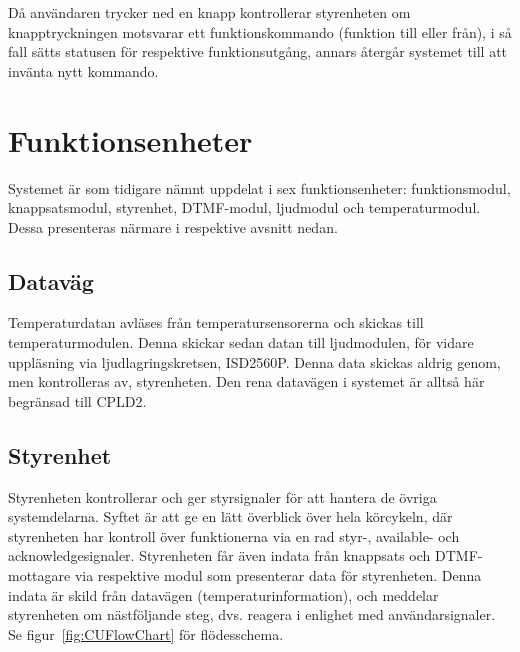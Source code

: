 \documentclass[a4paper,11pt]{article}
\begin{document}
Då användaren trycker ned en knapp kontrollerar styrenheten om knapptryckningen motsvarar ett funktionskommando (funktion till eller från), i så fall sätts statusen för respektive funktionsutgång, annars återgår systemet till att invänta nytt kommando.

\pagebreak

\section{Funktionsenheter}
\label{sec:Funktionsenheter}

Systemet är som tidigare nämnt uppdelat i sex funktionsenheter: funktionsmodul, knappsatsmodul, styrenhet, DTMF-modul, ljudmodul och temperaturmodul.
Dessa presenteras närmare i respektive avsnitt nedan.

	\subsection{Dataväg}
	Temperaturdatan avläses från temperatursensorerna och skickas till temperaturmodulen. Denna skickar sedan datan till ljudmodulen, för vidare uppläsning via ljudlagringskretsen, ISD2560P. Denna data skickas aldrig genom, men kontrolleras av, styrenheten. Den rena datavägen i systemet är alltså här begränsad till CPLD2.
	
	\subsection{Styrenhet}

	Styrenheten kontrollerar och ger styrsignaler för att hantera de övriga systemdelarna. Syftet är att ge en lätt överblick över hela körcykeln, där styrenheten har kontroll över funktionerna via en rad styr-, available- och acknowledgesignaler. Styrenheten får även indata från knappsats och DTMF-mottagare via respektive modul som presenterar data för styrenheten. Denna indata är skild från datavägen (temperaturinformation), och meddelar styrenheten om nästföljande steg, dvs. reagera i enlighet med användarsignaler. Se figur~\ref{fig:CUFlowChart} för flödesschema.
\end{document}
